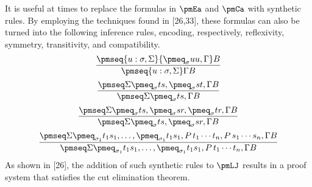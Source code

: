It is useful at times to replace the formulas in $\pmEa$ and $\pmCa$ with synthetic rules. By employing the techniques found in [26,33], these formulas can also be turned into the following inference rules, encoding, respectively, reflexivity, symmetry, transitivity, and compatibility.
\[\frac{\pmseq{u:\sigma,\Sigma}{\pmeq_\sigma u u,\Gamma}B}{\pmseq{u:\sigma,\Sigma}\Gamma B}\]
\[
\frac{\pmseq\Sigma{\pmeq_\sigma t s,\pmeq_\sigma s t,\Gamma}B}{\pmseq\Sigma{\pmeq_\sigma t s,\Gamma}B}\]
\[\frac{\pmseq\Sigma{\pmeq_\sigma t s,\pmeq_\sigma s r,\pmeq_\sigma t r,\Gamma}B}{\pmseq\Sigma{\pmeq_\sigma t s,\pmeq_\sigma s r,\Gamma}B}\]
\[\frac{\pmseq\Sigma{\pmeq_{\sigma_1}t_1s_1,\ldots,\pmeq_{\sigma_1}t_1s_1,P\,t_1\cdots t_n,P\,s_1\cdots s_n,\Gamma}B}{\pmseq\Sigma{\pmeq_{\sigma_1}t_1s_1,\ldots,\pmeq_{\sigma_1}t_1s_1,P\,t_1\cdots t_n,\Gamma}B}\]
As shown in [26], the addition of such synthetic rules to $\pmLJ$ results in a proof system that satisfies the cut elimination theorem.
